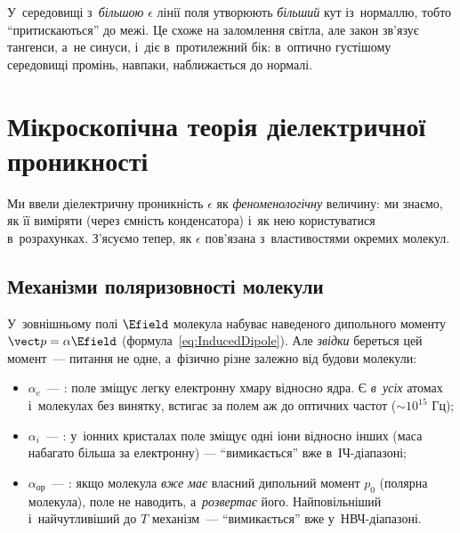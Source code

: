 \begin{Attention}
	У~середовищі з~\emph{більшою} $\epsilon$ лінії поля утворюють \emph{більший} кут
	із~нормаллю, тобто \enquote{притискаються} до межі. Це схоже на заломлення світла, але
	закон зв'язує тангенси, а~не синуси, і~діє в~протилежний бік: в~оптично густішому
	середовищі промінь, навпаки, наближається до нормалі.
\end{Attention}


\section{Мікроскопічна теорія діелектричної проникності}\hypertarget{microscopic-permittivity-theory}{}


Ми ввели діелектричну проникність $\epsilon$ як \emph{феноменологічну} величину: ми
знаємо, як її виміряти (через ємність конденсатора) і~як нею користуватися в~розрахунках.
З'ясуємо тепер, як $\epsilon$ пов'язана з~властивостями окремих молекул.


\subsection*{Механізми поляризовності молекули}\label{sec:AtomPolarizability}


У~зовнішньому полі $\Efield$ молекула набуває наведеного дипольного моменту $\vect p =
	\alpha\Efield$ (формула~\eqref{eq:InducedDipole}). Але \emph{звідки} береться цей
момент~--- питання не одне, а~фізично різне залежно від будови молекули:

\begin{itemize}
	\item $\alpha_e$~--- : поле зміщує легку електронну хмару відносно
	      ядра. Є \emph{в~усіх} атомах і~молекулах без винятку, встигає за полем аж до
	      оптичних частот ($\sim10^{15}$ Гц);
	\item $\alpha_i$~--- : у~іонних кристалах поле зміщує одні іони відносно
	      інших (маса набагато більша за електронну) --- \enquote{вимикається} вже
	      в~ІЧ-діапазоні;
	\item $\alpha_\text{ор}$~--- : якщо молекула \emph{вже має}
	      власний дипольний момент $p_0$ (полярна молекула), поле не наводить,
	      а~\emph{розвертає} його. Найповільніший і~найчутливіший до $T$ механізм~---
	      \enquote{вимикається} вже у~НВЧ-діапазоні.
\end{itemize}

